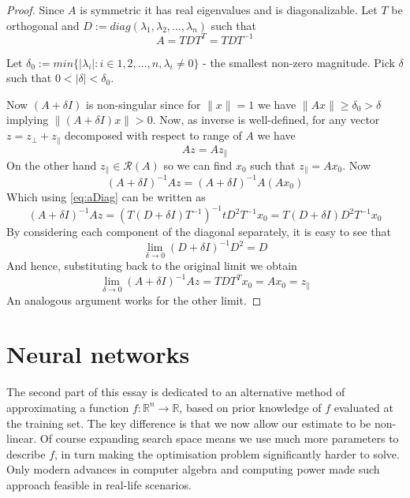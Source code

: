 \documentclass[a4paper]{article}
\theoremstyle{break}
\newcommand{\R}{\mathbb{R}}
\newcommand{\Ra}{\mathcal{R}}
\newcommand{\pll}{\parallel}
\begin{document}
\begin{proof}
    Since $A$ is symmetric it has real eigenvalues and is diagonalizable.
    Let $T$ be orthogonal and $D := diag(\lambda_1, \lambda_2, \ldots, \lambda_n)$ such that
    \begin{equation}
    \label{eq:aDiag}
        A = T D T^T = T D T^{-1}
    \end{equation}
    
    Let $ \delta_0 := min\{ | \lambda_i | : i \in {1, 2, \ldots, n}, \lambda_i \neq 0 \}$ - the smallest non-zero magnitude.
    Pick $ \delta$ such that $ 0 <  | \delta | < \delta_0$.
    
    Now $(A + \delta I)$ is non-singular since for $ \| x \| = 1$ we have $ \| A x \| \geq \delta_0 > \delta$
    implying $ \| (A + \delta I) x \| > 0 $.
    Now, as inverse is well-defined, for any vector $z = z_\perp + z_\pll$ decomposed with respect to range of $A$ we have
    $$ A z = A z_\pll$$
    On the other hand $z_\pll \in \Ra(A)$ so we can find $x_0$ such that $ z_\pll = A x_0$. Now
    $$ (A + \delta I)^{-1} A z = (A + \delta I)^{-1} A (A x_0) $$
    Which using \eqref{eq:aDiag} can be written as
    $$ (A + \delta I)^{-1} A z =
    (T(D + \delta I) T^{-1})^{-1} t D^2 T^{-1} x_0 =
    T (D + \delta I) D^2 T^{-1} x_0
    $$
    By considering each component of the diagonal separately, it is easy to see that
    $$ \lim_{\delta \to 0} (D + \delta I)^{-1} D^2 = D $$
    And hence, substituting back to the original limit we obtain
    $$ \lim_{\delta \to 0} ( A + \delta I) ^{-1} A z = T D T^T x_0 = A x_0 = z_\pll $$
    An analogous argument works for the other limit.
\end{proof}












\pagebreak
\section{Neural networks}
The second part of this essay is dedicated to an alternative method of approximating a function $ f : \R^n \to \R$, based on prior knowledge of $f$ evaluated at the training set. The key difference is that we now allow our estimate to be non-linear. Of course expanding search space means we use much more parameters to describe $f$, in turn making the optimisation problem significantly harder to solve. Only modern advances in computer algebra and computing power made such approach feasible in real-life scenarios.
\end{document}
